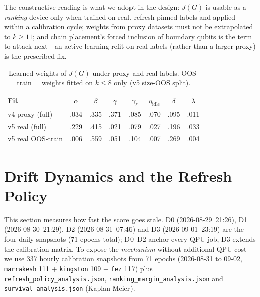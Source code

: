\documentclass[journal,10pt,twocolumn]{IEEEtran}
\begin{document}
The constructive reading is what we adopt in the design: $J(G)$ is usable as a \emph{ranking} device only when
trained on real, refresh-pinned labels and applied within a calibration cycle; weights from proxy datasets must
not be extrapolated to $k\ge11$; and chain placement's forced inclusion of boundary qubits is the term to attack
next---an active-learning refit on real labels (rather than a larger proxy) is the prescribed fix.

\begin{table}[t]
\caption{Learned weights of $J(G)$ under proxy and real labels. OOS-train = weights fitted on $k\le8$ only
(v5 size-OOS split).}
\label{tab:wgts}
\centering
\footnotesize
\setlength{\tabcolsep}{3pt}
\begin{tabular}{@{}lccccccc@{}}
\toprule
Fit & $\alpha$ & $\beta$ & $\gamma$ & $\gamma_{\ell}$ & $\eta_{\mathrm{idle}}$ & $\delta$ & $\lambda$\\
\midrule
v4 proxy (full) & .034 & .335 & .371 & .085 & .070 & .095 & .011\\
v5 real (full)  & .229 & .415 & .021 & .079 & .027 & .196 & .033\\
v5 real OOS-train & .006 & .559 & .051 & .104 & .007 & .269 & .004\\
\bottomrule
\end{tabular}
\end{table}

\section{Drift Dynamics and the Refresh Policy}
\label{sec:drift}
This section measures how fast the score goes stale. D0 (2026-08-29~21:26), D1 (2026-08-30~21:29), D2 (2026-08-31~07:46) and D3 (2026-09-01~23:19) are the
four daily snapshots (71 epochs total); D0--D2 anchor every QPU job, D3 extends the calibration matrix. To expose the
\emph{mechanism} without additional QPU cost we use 337 hourly calibration snapshots from 71 epochs
(2026-08-31 to 09-02, \texttt{marrakesh} 111 + \texttt{kingston} 109 + \texttt{fez} 117) plus
\texttt{refresh\_policy\_analysis.json}, \texttt{ranking\_margin\_analysis.json} and
\texttt{survival\_analysis.json} (Kaplan-Meier).
\end{document}
